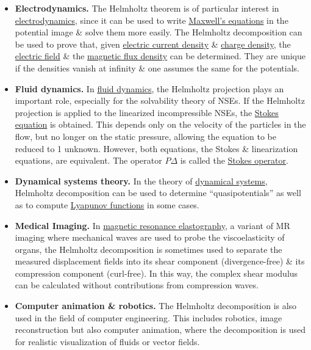 \documentclass{article}
\begin{document}
\begin{itemize}
	\item {\bf Electrodynamics.} The Helmholtz theorem is of particular interest in \href{https://en.wikipedia.org/wiki/Electrodynamics}{electrodynamics}, since it can be used to write \href{https://en.wikipedia.org/wiki/Maxwell%27s_equations}{Maxwell's equations} in the potential image \& solve them more easily. The Helmholtz decomposition can be used to prove that, given \href{https://en.wikipedia.org/wiki/Electric_current_density}{electric current density} \& \href{https://en.wikipedia.org/wiki/Charge_density}{charge density}, the \href{https://en.wikipedia.org/wiki/Electric_field}{electric field} \& the \href{https://en.wikipedia.org/wiki/Magnetic_flux_density}{magnetic flux density} can be determined. They are unique if the densities vanish at infinity \& one assumes the same for the potentials.
	\item {\bf Fluid dynamics.} In \href{https://en.wikipedia.org/wiki/Fluid_dynamics}{fluid dynamics}, the Helmholtz projection plays an important role, especially for the solvability theory of NSEs. If the Helmholtz projection is applied to the linearized incompressible NSEs, the \href{https://en.wikipedia.org/wiki/Stokes_flow}{Stokes equation} is obtained. This depends only on the velocity of the particles in the flow, but no longer on the static pressure, allowing the equation to be reduced to 1 unknown. However, both equations, the Stokes \& linearization equations, are equivalent. The operator $P\Delta$ is called the \href{https://en.wikipedia.org/wiki/Stokes_operator}{Stokes operator}.
	\item {\bf Dynamical systems theory.} In the theory of \href{https://en.wikipedia.org/wiki/Dynamical_system}{dynamical systems}, Helmholtz decomposition can be used to determine ``quasipotentials'' as well as to compute \href{https://en.wikipedia.org/wiki/Lyapunov_function}{Lyapunov functions} in some cases. 
	\item {\bf Medical Imaging.} In \href{https://en.wikipedia.org/wiki/Magnetic_resonance_elastography}{magnetic resonance elastography}, a variant of MR imaging where mechanical waves are used to probe the viscoelasticity of organs, the Helmholtz decomposition is sometimes used to separate the measured displacement fields into its shear component (divergence-free) \& its compression component (curl-free). In this way, the complex shear modulus can be calculated without contributions from compression waves.
	\item {\bf Computer animation \& robotics.} The Helmholtz decomposition is also used in the field of computer engineering. This includes robotics, image reconstruction but also computer animation, where the decomposition is used for realistic visualization of fluids or vector fields.
\end{itemize}
\end{document}
